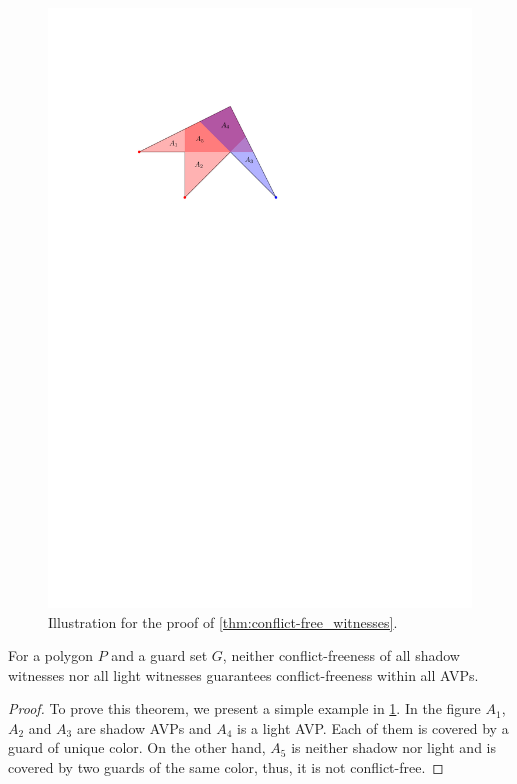\begin{figure}[htbp]
\centering
\includegraphics[scale=1.3]{Thesis/figures/conflict-free_witnesses.pdf}
\caption{Illustration for the proof of \cref{thm:conflict-free_witnesses}.}
\label{fig:conflict-free_witnesses}
\end{figure}

\begin{theorem}\label{thm:conflict-free_witnesses}
For a polygon $P$ and a guard set $G$, neither conflict-freeness of all shadow witnesses nor all light witnesses guarantees conflict-freeness within all AVPs.
\end{theorem}
\begin{proof}
To prove this theorem, we present a simple example in \cref{fig:conflict-free_witnesses}. In the figure $A_{1}$, $A_{2}$ and $A_{3}$ are shadow AVPs and $A_{4}$ is a light AVP. Each of them is covered by a guard of unique color. On the other hand, $A_{5}$ is neither shadow nor light and is covered by two guards of the same color, thus, it is not conflict-free.
\end{proof}

